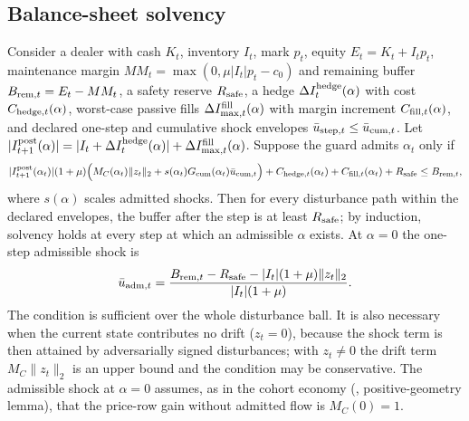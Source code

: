 \subsection{Balance-sheet solvency}

\begin{theorem}\label{thm:forward}
Consider a dealer with cash $K_t$, inventory $I_t$, mark $p_t$, equity $E_t=K_t+I_tp_t$, maintenance margin $MM_t=\max(0,\mu|I_t|p_t-c_0)$ and remaining buffer $B_{{\rm rem},t}=E_t-MM_t$, a safety reserve $R_{\rm safe}$, a hedge $\Delta I^{\rm hedge}_t(\alpha)$ with cost $C_{{\rm hedge},t}(\alpha)$, worst-case passive fills $\Delta I^{\rm fill}_{\max,t}(\alpha)$ with margin increment $C_{{\rm fill},t}(\alpha)$, and declared one-step and cumulative shock envelopes $\bar u_{{\rm step},t}\le\bar u_{{\rm cum},t}$. Let $|I^{\rm post}_{t+1}(\alpha)|=|I_t+\Delta I^{\rm hedge}_t(\alpha)|+\Delta I^{\rm fill}_{\max,t}(\alpha)$. Suppose the guard admits $\alpha_t$ only if
\begin{equation}\label{eq:guardineq}
|I^{\rm post}_{t+1}(\alpha_t)|(1+\mu)\Bigl(M_{C}(\alpha_t)\|z_t\|_2+s(\alpha_t)G_{\rm cum}(\alpha_t)\bar u_{{\rm cum},t}\Bigr)+C_{{\rm hedge},t}(\alpha_t)+C_{{\rm fill},t}(\alpha_t)+R_{\rm safe}\le B_{{\rm rem},t},
\end{equation}
where $s(\alpha)$ scales admitted shocks. Then for every disturbance path within the declared envelopes, the buffer after the step is at least $R_{\rm safe}$; by induction, solvency holds at every step at which an admissible $\alpha$ exists. At $\alpha=0$ the one-step admissible shock is
\[
\bar u_{{\rm adm},t}=\frac{B_{{\rm rem},t}-R_{\rm safe}-|I_t|(1+\mu)\|z_t\|_2}{|I_t|(1+\mu)} .
\]
The condition is sufficient over the whole disturbance ball. It is also necessary when the current state contributes no drift ($z_t=0$), because the shock term is then attained by adversarially signed disturbances; with $z_t\neq0$ the drift term $M_C\|z_t\|_2$ is an upper bound and the condition may be conservative. The admissible shock at $\alpha=0$ assumes, as in the cohort economy (\citealp{niroula2026}, positive-geometry lemma), that the price-row gain without admitted flow is $M_C(0)=1$.
\end{theorem}

